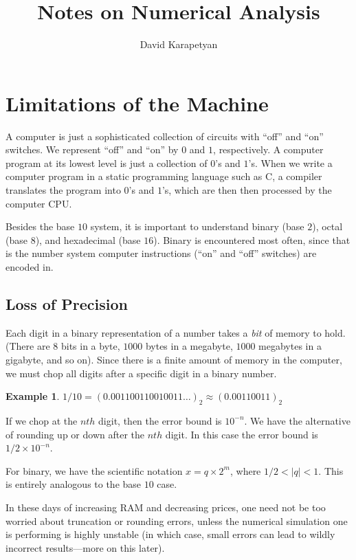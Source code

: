 \documentclass[12pt]{article}
\theoremstyle{plain}
\theoremstyle{definition}
\newtheorem*{example}{Example}
\theoremstyle{remark}
\numberwithin{equation}{section}  %
\begin{document}
\title{Notes on Numerical Analysis }
\author{David Karapetyan}
\date{}
\maketitle
\newpage
\setcounter{tocdepth}{2}
\tableofcontents

\newpage
\section{Limitations of the Machine}
A computer is just a sophisticated collection of circuits
with ``off'' and ``on'' switches. We represent ``off'' and
``on'' by $0$ and $1$, respectively. A computer program 
at its lowest level is just a collection of $0$'s and $1$'s.
When we write a computer program in a static programming language such as C, a
compiler translates the program into $0$'s and $1$'s, which are then then processed by the computer CPU.

Besides the base $10$ system, it is important to understand binary (base $2$),
octal (base $8$), and hexadecimal (base $16$). Binary is encountered most often,
since that is the number system computer instructions (``on'' and ``off'' switches)
are encoded in.

\subsection{Loss of Precision}
Each digit in a binary representation of a number takes a \emph{bit} of memory
to hold. (There are $8$ bits in a byte, $1000$ bytes in a megabyte, $1000$
megabytes in a gigabyte, and so on). Since there is a finite amount of memory in
the computer, we must chop all digits after a specific digit in a binary number. 
\begin{example}
$1/10 = (0.001100110010011\ldots)_2 \approx (0.00110011)_2$
\end{example}
If we chop at the $nth$ digit, then the error bound is $10^{-n}$.
We have the alternative of rounding up or down after the $nth$ digit. 
In this case the error bound is $1/2 \times 10^{-n}$.

For binary, we have the scientific notation $x = q \times 2^{m}$, where
$1/2 < |q| < 1$. This is entirely analogous to the base $10$ case.

In these days of increasing RAM and decreasing prices, one need not be too worried
about truncation or rounding errors, unless the numerical simulation one is performing
is highly unstable (in which case, small errors can lead to wildly incorrect results---more
on this later).
\end{document}
